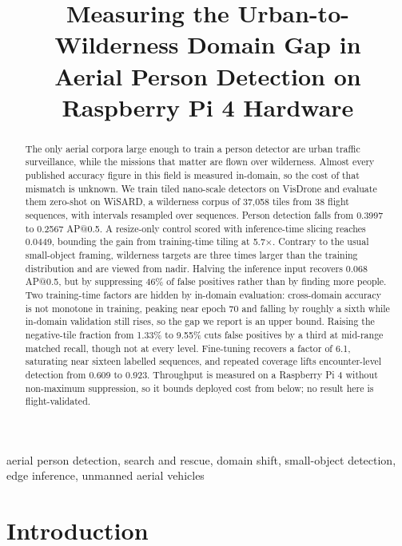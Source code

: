 \documentclass[conference]{IEEEtran}
\begin{document}
\title{Measuring the Urban-to-Wilderness Domain Gap in\\
Aerial Person Detection on Raspberry Pi 4 Hardware}

\maketitle

\begin{abstract}
The only aerial corpora large enough to train a person detector are urban
traffic surveillance, while the missions that matter are flown over wilderness.
Almost every published accuracy figure in this field is measured in-domain, so
the cost of that mismatch is unknown. We train tiled nano-scale detectors on
VisDrone and evaluate them zero-shot on WiSARD, a wilderness corpus of 37,058
tiles from 38 flight sequences, with intervals resampled over sequences. Person
detection falls from 0.3997 to 0.2567 AP@0.5. A resize-only control scored with
inference-time slicing reaches 0.0449, bounding the gain from training-time
tiling at 5.7$\times$. Contrary to the usual small-object framing, wilderness
targets are three times larger than the training distribution and are viewed
from nadir. Halving the inference input recovers 0.068 AP@0.5, but by
suppressing 46\% of false positives rather than by finding more people. Two
training-time factors are hidden by in-domain evaluation: cross-domain accuracy
is not monotone in training, peaking near epoch 70 and falling by roughly a
sixth while in-domain validation still rises, so the gap we report is an upper
bound. Raising the negative-tile fraction from 1.33\% to 9.55\% cuts false
positives by a third at mid-range matched recall, though not at every level.
Fine-tuning recovers a factor of 6.1, saturating near sixteen labelled
sequences, and repeated coverage lifts encounter-level detection from 0.609 to
0.923. Throughput is measured on a Raspberry Pi 4 without non-maximum
suppression, so it bounds deployed cost from below; no result here is
flight-validated.
\end{abstract}

\begin{IEEEkeywords}
aerial person detection, search and rescue, domain shift, small-object
detection, edge inference, unmanned aerial vehicles
\end{IEEEkeywords}

\section{Introduction}
\end{document}
